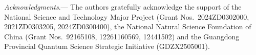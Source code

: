 \documentclass[%
 superscriptaddress,
 aps,prl,
 reprint,
 twocolumn,
 amsmath,amssymb,showpacs,
 bibnotes,
]{revtex4-2}
\begin{document}
\emph{Acknowledgments}.---
    The authors gratefully acknowledge the support of the National Science and Technology Major Project (Grant Nos.\ 2024ZD0302000, 2021ZD0303205, 2024ZD0300400), the National Natural Science Foundation of China (Grant Nos.\ 92165108, 12261160569, 12441502) and the Guangdong Provincial Quantum Science Strategic Initiative (GDZX2505001).


\end{document}

